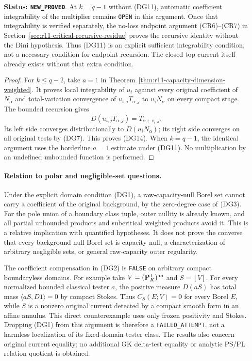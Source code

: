 \documentclass[11pt,a4paper]{article}
\numberwithin{equation}{section}
\theoremstyle{definition}
\theoremstyle{remark}
\begin{document}
\noindent\textbf{Status: \texttt{NEW\_PROVED}}.
At $k=q-1$ without (DG11), automatic coefficient integrability
of the multiplier remains \texttt{OPEN} in this argument.
Once that integrability is verified separately, the no-loss
endpoint argument (CR6)--(CR7) in
Section~\ref{sec:r11-critical-recursive-residue} proves the
recursive identity without the Dini hypothesis. Thus (DG11)
is an explicit sufficient integrability condition, not a
necessary condition for endpoint recursion. The closed top
current itself already exists without that extra condition.

\begin{proof}
For $k\leq q-2$, take $a=1$ in
Theorem~\ref{thm:r11-capacity-dimension-weighted}.
It proves local integrability of $u_i$ against every original
coefficient of $N_\alpha$ and total-variation convergence of
$u_{i,j}T_{\alpha,j}$ to $u_iN_\alpha$ on every compact stage.
The bounded recursion gives
\[
                  D(u_{i,j}T_{\alpha,j})=T_{\alpha+e_i,j}.
\]
Its left side converges distributionally to $D(u_iN_\alpha)$;
its right side converges on all original tests by (DG7).
This proves (DG14). When $k=q-1$, the identical argument uses
the borderline $a=1$ estimate under (DG11). No multiplication
by an undefined unbounded function is performed.
\end{proof}

\paragraph{Relation to polar and negligible-set questions.}
Under the explicit domain condition (DG1), a raw-capacity-null
Borel set cannot carry a coefficient of the original background,
by the zero-degree case of (DG3). For the pole union of a boundary
class tuple, outer nullity is already known, and all partial
unbounded products and subcritical weighted products avoid it.
This is a relative implication with quantified hypotheses.
It does not prove the converse that every background-null Borel
set is capacity-null, a characterization of arbitrary negligible
sets, or general raw-capacity outer regularity.

The coefficient compensation in (DG2) is \texttt{FALSE} on
arbitrary compact boundaryless domains. For example take
$V=(\mathbf P^1_K)^{\rm an}$ and $S=[V]$. For every normalized
bounded classical tester $a$, the positive measure $D(aS)$ has
total mass $\langle aS,D1\rangle=0$ by compact Stokes. Thus
$C_S(E;V)=0$ for every Borel $E$, while $S$ is a nonzero original
current detected by a compact smooth form in an affine annulus.
This direct counterexample uses only frozen positivity and Stokes.
Dropping (DG1) from this argument is therefore a
\texttt{FAILED\_ATTEMPT}, not a harmless localization of its
fixed-domain tester class. The results also concern original
current equality; no additional GK delta-test equality or
analytic PS/PL relation quotient is obtained.
\end{document}
